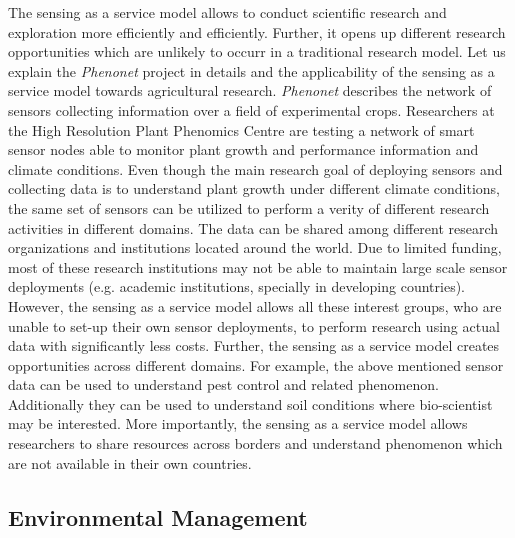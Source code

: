 \documentclass[times]{ettauth}
\begin{document}
The sensing as a service model allows to conduct scientific research and exploration more efficiently and efficiently. Further, it opens up different research opportunities which are unlikely to occurr in a traditional research model. Let us explain the \textit{Phenonet} project in details and the applicability of the sensing as a service model towards agricultural research. \textit{Phenonet} describes the network of sensors collecting information over a field of experimental crops. Researchers at the High Resolution Plant Phenomics Centre are testing a network of smart sensor nodes able to monitor plant growth and performance information and climate conditions. Even though the main research goal of deploying sensors and collecting data is to understand plant growth under different climate conditions, the same set of sensors can be utilized to perform a verity of different research activities in different domains. The data can be shared among different research organizations and institutions located around the world. Due to limited funding, most of these research institutions may not be able to maintain large scale sensor deployments (e.g. academic institutions, specially in developing countries). However, the sensing as a service model allows all these interest groups, who are unable to set-up their own sensor deployments, to perform research using actual data with significantly less costs. Further, the sensing as a service model creates opportunities across different domains. For example, the above mentioned sensor data can be used to understand pest control and related phenomenon. Additionally they can be used to understand soil conditions where bio-scientist may be interested. More importantly, the  sensing as a service model allows researchers to share resources across  borders and understand phenomenon which are not available in their own countries. 






\subsection{Environmental Management}
\label{sec:Action:Environment_Pollution_Management}
\end{document}
